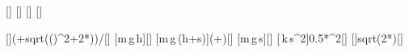 [\kg]
[\meter]
[\Npm]
[\mpss]

[]{(\mBX*\gX+sqrt((\mBX*\gX)^2+2*\kBX*\mBX*\gX*\hBX))/\kBX}[\meter]
[m\,g\,h]{\mBX*\gX*\hBX}[\joule]
[m\,g\,(h+s)]{\mBX*\gX*(\hBX+\sBX)}[\joule]
[m\,g\,s]{\mBX*\gX*\sBX}[\joule]
[\,k\,s^2]{0.5*\kBX*\sBX^2}[\joule]
[]{sqrt(2*\gX*\hBX)}[\mps]
